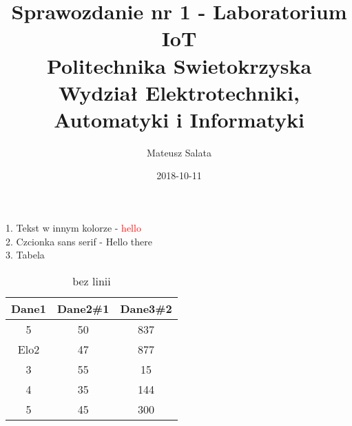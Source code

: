 \documentclass{article}
\title{Sprawozdanie nr 1 - Laboratorium IoT \\
Politechnika Swietokrzyska
Wydział Elektrotechniki, Automatyki i Informatyki}
\author{Mateusz Salata}
\date{2018-10-11}
\begin{document}
\maketitle
\large 1. Tekst w innym kolorze -
\textcolor{red}{ hello} \\
\large 2. Czcionka sans serif -
\textsf {Hello there} \\
\large 3. Tabela \\
\begin{table}[ht]
	\caption{bez linii} 
	\centering 
	\begin{tabular}{c c c} 
	\hline 
	\color{blue}Dane1 & Dane2\#1 & Dane3\#2 \\ [0.5ex] 
	\hline 
	5 & 50 & 837 \\ 
	\textsf {Elo2}  & 47 & 877 \\
	3 & 55 & 15 \\
	4 & 35 & 144  \\
	5 & 45 & 300  \\ [1ex]
\hline 
\end{tabular}
\label{table:nonlin}
\end{table}


\end{document}
